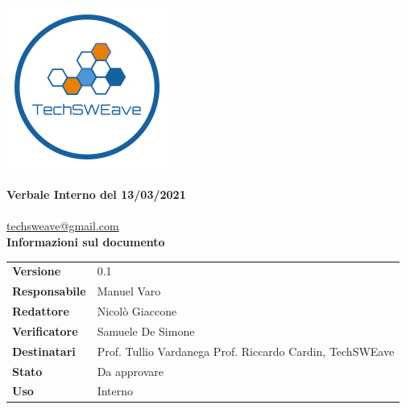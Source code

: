 \documentclass[a4paper]{article}
\begin{document}
\begin{titlepage}
    \begin{center}
        \includegraphics{../../../../Images/logo}\\
        \vspace{20px}
        \textcolor{logo}{\hrulefill}\\
        \vspace{20px}
        \textbf{\huge\textcolor{logo}{Verbale Interno del 13/03/2021}}\\
        \vspace{10px}
        \textcolor{logo}{\hrulefill}\\
        \vspace{20px}
        \href{mailto:techsweave@gmail.com}{techsweave@gmail.com}\\
        \vspace{40px}
        \textbf{Informazioni sul documento}\\
        \vspace{20px}
        \begin{tabular}{p{100px} | p{100px}}
            \textbf{Versione} & 0.1\\
            \textbf{Responsabile} & Manuel Varo\\
            \textbf{Redattore} & Nicolò Giaccone\\
            \textbf{Verificatore} & Samuele De Simone\\
            \textbf{Destinatari} & Prof. Tullio Vardanega \newline Prof. Riccardo Cardin, \newline TechSWEave\\
            \textbf{Stato} & Da approvare\\
            \textbf{Uso} & Interno\\
        \end{tabular}
            \vspace{1ex}

    \end{center}
    \end{titlepage}
\end{document}

